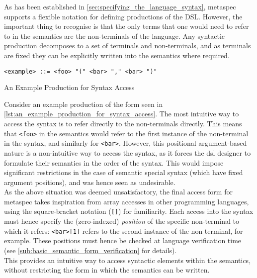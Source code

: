 As has been established in \autoref{sec:specifying_the_language_syntax}, \gls{metaspec} supports a flexible notation for defining productions of the DSL. 
However, the important thing to recognise is that the only terms that one would need to refer to in the semantics are the non-terminals of the language. 
Any syntactic production decomposes to a set of terminals and non-terminals, and as terminals are fixed they can be explicitly written into the semantics where required. \\

\begin{listing}[!htb]
\begin{verbatim}
<example> ::= <foo> "(" <bar> "," <bar> ")"
\end{verbatim}
\caption{An Example Production for Syntax Access}
\label{lst:an_example_production_for_syntax_access}
\end{listing}

Consider an example production of the form seen in \autoref{lst:an_example_production_for_syntax_access}. 
The most intuitive way to access the syntax is to refer directly to the non-terminals directly.
This means that \texttt{<foo>} in the semantics would refer to the first instance of the non-terminal in the syntax, and similarly for \texttt{<bar>}.
However, this positional argument-based nature is a non-intuitive way to access the syntax, as it forces the \gls{dsl} designer to formulate their semantics in the order of the syntax. 
This would impose significant restrictions in the case of semantic special syntax (which have fixed argument positions), and was hence seen as undesirable.\\

As the above situation was deemed unsatisfactory, the final access form for \gls{metaspec} takes inspiration from array accesses in other programming languages, using the square-bracket notation (\texttt{[]}) for familiarity.
Each access into the syntax must hence specify the (zero-indexed) \textit{position} of the specific non-terminal to which it refers: \texttt{<bar>[1]} refers to the second instance of the non-terminal, for example.
These positions must hence be checked at language verification time (see \autoref{sub:basic_semantic_form_verification} for details).\\

This provides an intuitive way to access syntactic elements within the semantics, without restricting the form in which the semantics can be written. 

